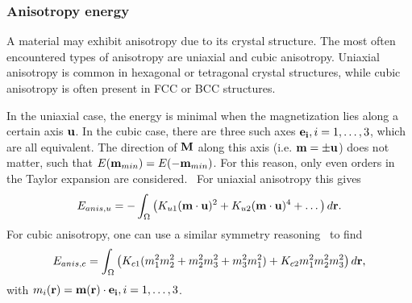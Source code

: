 \documentclass[10pt,a4paper]{article}
\begin{document}
\subsubsection{Anisotropy energy}
A material may exhibit anisotropy due to its crystal structure. The most often encountered types of anisotropy are uniaxial and cubic anisotropy. Uniaxial anisotropy is common in hexagonal or tetragonal crystal structures, while cubic anisotropy is often present in FCC or BCC structures.~\cite{Gilbert1956, abert2013discrete} \par
In the uniaxial case, the energy is minimal when the magnetization lies along a certain axis $\vb{u}$. In the cubic case, there are three such axes $\vb{e_i}, i=1,\dots,3$, which are all equivalent. The direction of $\vb{M}$ along this axis (i.e. $\vb{m}=\pm \vb{u}$) does not matter, such that $E(\vb{m}_{min}) = E(-\vb{m}_{min})$. For this reason, only even orders in the Taylor expansion are considered.~\cite{abert2013discrete} For uniaxial anisotropy this gives
\begin{equation}
    E_{anis,u} = - \int_\Omega \big(K_{u1} (\vb{m} \cdot \vb{u})^2 + K_{u2} (\vb{m} \cdot \vb{u})^4 + \dots\big) \, d\vb{r} \mathrm{.} \label{eq:Energy_Term_AnisUniaxial}
\end{equation}
For cubic anisotropy, one can use a similar symmetry reasoning~\cite{abert2013discrete} to find
\begin{equation}
    E_{anis,c} = \int_\Omega \big(K_{c1} (m_1^2m_2^2 + m_2^2m_3^2 + m_3^2m_1^2) + K_{c2} m_1^2m_2^2m_3^2\big) \, d\vb{r} \mathrm{,} \label{eq:Energy_Term_AnisCubic}
\end{equation}
with $m_i(\vb{r}) = \vb{m}(\vb{r}) \cdot \vb{e_i}, i=1,\dots,3$.
\end{document}
